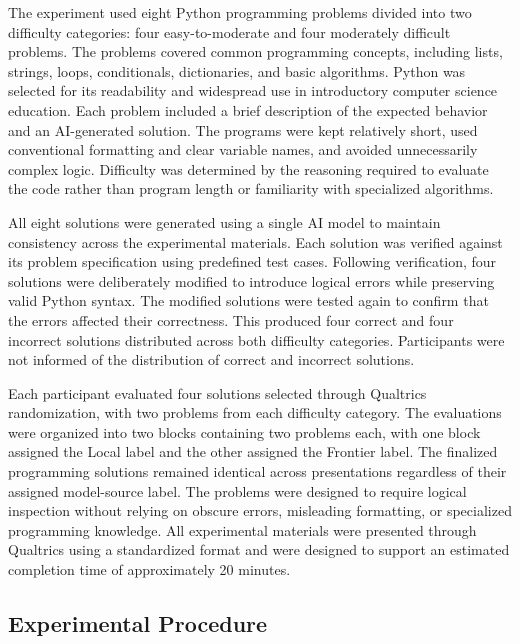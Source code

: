 \documentclass[manuscript,review]{acmart}
\begin{document}
The experiment used eight Python programming problems divided into two difficulty categories: four easy-to-moderate and four moderately difficult problems. The problems covered common programming concepts, including lists, strings, loops, conditionals, dictionaries, and basic algorithms. Python was selected for its readability and widespread use in introductory computer science education. Each problem included a brief description of the expected behavior and an AI-generated solution. The programs were kept relatively short, used conventional formatting and clear variable names, and avoided unnecessarily complex logic. Difficulty was determined by the reasoning required to evaluate the code rather than program length or familiarity with specialized algorithms.

All eight solutions were generated using a single AI model to maintain consistency across the experimental materials. Each solution was verified against its problem specification using predefined test cases. Following verification, four solutions were deliberately modified to introduce logical errors while preserving valid Python syntax. The modified solutions were tested again to confirm that the errors affected their correctness. This produced four correct and four incorrect solutions distributed across both difficulty categories. Participants were not informed of the distribution of correct and incorrect solutions.

Each participant evaluated four solutions selected through Qualtrics randomization, with two problems from each difficulty category. The evaluations were organized into two blocks containing two problems each, with one block assigned the Local label and the other assigned the Frontier label. The finalized programming solutions remained identical across presentations regardless of their assigned model-source label. The problems were designed to require logical inspection without relying on obscure errors, misleading formatting, or specialized programming knowledge. All experimental materials were presented through Qualtrics using a standardized format and were designed to support an estimated completion time of approximately 20 minutes.


\subsection{Experimental Procedure}
\end{document}
